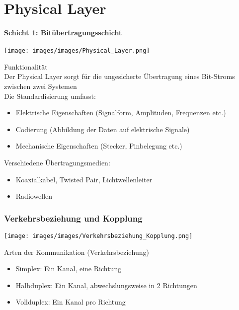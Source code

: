 \section{Physical Layer}
\paragraph{Schicht 1: Bitübertragungsschicht}
\texttt{[image: images/images/Physical\_Layer.png]}
\begin{definition}{Funktionalität}\\
    Der Physical Layer sorgt für die ungesicherte Übertragung eines Bit-Stroms zwischen zwei Systemen\\
    Die Standardisierung umfasst:
\begin{itemize}
    \item Elektrische Eigenschaften (Signalform, Amplituden, Frequenzen etc.)
    \item Codierung (Abbildung der Daten auf elektrische Signale)
    \item Mechanische Eigenschaften (Stecker, Pinbelegung etc.)
\end{itemize}
\end{definition}

\begin{remark}
    Verschiedene Übertragungsmedien:
    \begin{itemize}
        \item Koaxialkabel, Twisted Pair, Lichtwellenleiter
        \item Radiowellen
    \end{itemize}
\end{remark}

\subsubsection{Verkehrsbeziehung und Kopplung}
\texttt{[image: images/images/Verkehrsbeziehung\_Kopplung.png]}
\begin{concept}{Arten der Kommunikation (Verkehrsbeziehung)}
    \begin{itemize}
        \item Simplex: Ein Kanal, eine Richtung
        \item Halbduplex: Ein Kanal, abwechslungsweise in 2 Richtungen
        \item Vollduplex: Ein Kanal pro Richtung
    \end{itemize}
\end{concept}

